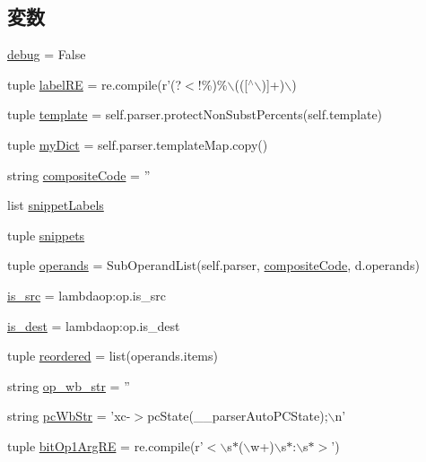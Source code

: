 \subsection*{変数}
\begin{DoxyCompactItemize}
\item 
\hyperlink{namespaceisa__parser_a0514aabed091ee5e2f35766eb01eced6}{debug} = False
\item 
tuple \hyperlink{namespaceisa__parser_a9080638e0d8d120d2aabf434965f7124}{labelRE} = re.compile(r'(?$<$!\%)\%$\backslash$((\mbox{[}$^\wedge$$\backslash$)\mbox{]}+)$\backslash$)
\item 
tuple \hyperlink{namespaceisa__parser_a0f1bc778406f56e30920245ffbb1f9d4}{template} = self.parser.protectNonSubstPercents(self.template)
\item 
tuple \hyperlink{namespaceisa__parser_a5e9a69b632504688c1674beaebcc950f}{myDict} = self.parser.templateMap.copy()
\item 
string \hyperlink{namespaceisa__parser_a11f5a6b80110eac01720f07c7d95f9b8}{compositeCode} = ''
\item 
list \hyperlink{namespaceisa__parser_af5f95d808440c1302a57e2c64df31f1b}{snippetLabels}
\item 
tuple \hyperlink{namespaceisa__parser_a34e16cdb1c61ee90cc70b4783e8b84c1}{snippets}
\item 
tuple \hyperlink{namespaceisa__parser_a1c9c5f3c4208b4329d016f1b16c3cb31}{operands} = SubOperandList(self.parser, \hyperlink{namespaceisa__parser_a11f5a6b80110eac01720f07c7d95f9b8}{compositeCode}, d.operands)
\item 
\hyperlink{namespaceisa__parser_a1a1258870d1ef965556926e8c49fc793}{is\_\-src} = lambdaop:op.is\_\-src
\item 
\hyperlink{namespaceisa__parser_ab7ff5b63e918e86c764db97b98f6101c}{is\_\-dest} = lambdaop:op.is\_\-dest
\item 
tuple \hyperlink{namespaceisa__parser_a9d7830b87106f80f05e24edc246122ce}{reordered} = list(operands.items)
\item 
string \hyperlink{namespaceisa__parser_a439493fe85dc4056675731bc6214b979}{op\_\-wb\_\-str} = ''
\item 
string \hyperlink{namespaceisa__parser_a6b2a2006e7ddea3921d2bd40e49aed4a}{pcWbStr} = 'xc-\/$>$pcState(\_\-\_\-parserAutoPCState);$\backslash$n'
\item 
tuple \hyperlink{namespaceisa__parser_aa2e16188b1be76203f29251442174b29}{bitOp1ArgRE} = re.compile(r'$<$$\backslash$s$\ast$($\backslash$w+)$\backslash$s$\ast$:$\backslash$s$\ast$$>$')
$$
\end{DoxyCompactItemize}

